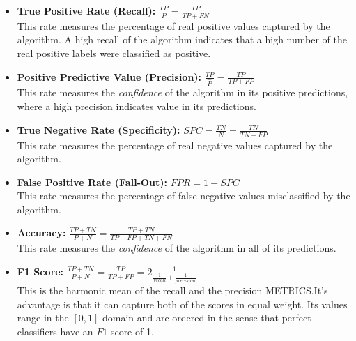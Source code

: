 \begin{itemize}
\item \textbf{True Positive Rate (Recall):} $\frac{TP}{P} = \frac{TP}{TP + FN}$ \\ This rate measures the percentage of real positive values captured by the algorithm. A high recall of the algorithm indicates that a high number of the real positive labels were classified as positive.


\item \textbf{Positive Predictive Value (Precision):} $\frac{TP}{\hat{P}} = \frac{TP}{TP + FP}$ \\ This rate measures the \textit{confidence} of the algorithm in its positive predictions, where a high precision indicates value in its predictions.

\item \textbf{True Negative Rate (Specificity):} $ SPC = \frac{TN}{N} = \frac{TN}{TN + FP}$ \\ This rate measures the percentage of real negative values captured by the algorithm.


\item \textbf{False Positive Rate (Fall-Out):} $FPR = 1 - SPC$ \\ This rate measures the percentage of false negative values misclassified by the algorithm.

\item \textbf{Accuracy:} $\frac{TP + TN}{P + N} = \frac{TP + TN}{TP + FP + TN + FN}$ \\ This rate measures the \textit{confidence} of the algorithm in all of its predictions.

%
\item \textbf{F1 Score:} $\frac{TP + TN}{P + N} = \frac{TP}{TP + FP} = 2 \frac{1}{ \frac{1}{recall} + \frac{1}{precision} }$ \\ This is the harmonic mean of the recall and the precision METRICS.\@ It's advantage is that it can capture both of the scores in equal weight. Its values range in the ${[0,1 ]}$ domain and are ordered in the sense that perfect classifiers have an $F1$ score of 1.

\end{itemize}



